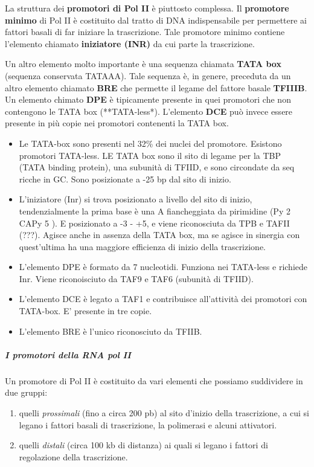 \documentclass[]{article}
\begin{document}
La struttura dei \textbf{promotori di Pol II} è piuttosto complessa. Il
\textbf{promotore minimo} di Pol II è costituito dal tratto di DNA
indispensabile per permettere ai fattori basali di far iniziare la
trascrizione. Tale promotore minimo contiene l'elemento chiamato
\textbf{iniziatore (INR)} da cui parte la trascrizione.

Un altro elemento molto importante è una sequenza chiamata \textbf{TATA
box} (sequenza conservata TATAAA). Tale sequenza è, in genere, preceduta
da un altro elemento chiamato \textbf{BRE} che permette il legame del
fattore basale \textbf{TFIIIB}. Un elemento chimato \textbf{DPE} è
tipicamente presente in quei promotori che non contengono le TATA box
(**TATA-less*). L'elemento \textbf{DCE} può invece essere presente in
più copie nei promotori contenenti la TATA box.

\begin{itemize}
\item
  Le TATA-box sono presenti nel 32\% dei nuclei del promotore. Esistono
  promotori TATA-less. LE TATA box sono il sito di legame per la TBP
  (TATA binding protein), una subunità di TFIID, e sono circondate da
  seq ricche in GC. Sono posizionate a -25 bp dal sito di inizio.
\item
  L'iniziatore (Inr) si trova posizionato a livello del sito di inizio,
  tendenzialmente la prima base è una A fiancheggiata da pirimidine (Py
  2 CAPy 5 ). E posizionato a -3 - +5, e viene riconosciuta da TPB e
  TAFII (???). Agisce anche in assenza della TATA box, ma se agisce in
  sinergia con quest'ultima ha una maggiore efficienza di inizio della
  trascrizione.
\item
  L'elemento DPE è formato da 7 nucleotidi. Funziona nei TATA-less e
  richiede Inr. Viene riconoisciuto da TAF9 e TAF6 (subunità di TFIID).
\item
  L'elemento DCE è legato a TAF1 e contribuisce all'attività dei
  promotori con TATA-box. E' presente in tre copie.
\item
  L'elemento BRE è l'unico riconosciuto da TFIIB.
\end{itemize}

\subparagraph{I promotori della RNA pol
II}\label{i-promotori-della-rna-pol-ii}

Un promotore di Pol II è costituito da vari elementi che possiamo
suddividere in due gruppi:

\begin{enumerate}
\def\labelenumi{\arabic{enumi}.}
\itemsep1pt\parskip0pt
\item
  quelli \emph{prossimali} (fino a circa 200 pb) al sito d'inizio della
  trascrizione, a cui si legano i fattori basali di trascrizione, la
  polimerasi e alcuni attivatori.
\item
  quelli \emph{distali} (circa 100 kb di distanza) ai quali si legano i
  fattori di regolazione della trascrizione.
\end{enumerate}
\end{document}
